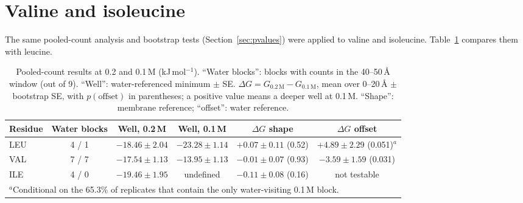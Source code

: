 \documentclass[11pt,a4paper]{article}
\begin{document}
\section{Valine and isoleucine}
\label{sec:val_ile}

The same pooled-count analysis and bootstrap tests (Section~\ref{sec:pvalues}) were applied to
valine and isoleucine.
Table~\ref{tab:val_ile} compares them with leucine.

\begin{table}[H]
\centering
\caption{Pooled-count results at 0.2 and 0.1\,M (kJ\,mol$^{-1}$). ``Water blocks'': blocks
with counts in the 40--50\,\AA{} window (out of 9). ``Well'': water-referenced minimum
$\pm$ SE. $\Delta G = G_{0.2\,\text{M}} - G_{0.1\,\text{M}}$, mean over 0--20\,\AA{} $\pm$
bootstrap SE, with $p(\text{offset})$ in parentheses; a positive value means a deeper well at
0.1\,M. ``Shape'': membrane reference; ``offset'': water reference.}
\label{tab:val_ile}
\small
\setlength{\tabcolsep}{4pt}
\begin{tabular}{lccccc}
\toprule
Residue & Water blocks & Well, 0.2\,M & Well, 0.1\,M & $\Delta G$ shape & $\Delta G$ offset \\
\midrule
LEU & 4 / 1 & $-18.46 \pm 2.04$ & $-23.28 \pm 1.14$ & $+0.07 \pm 0.11$ (0.52) & $+4.89 \pm 2.29$ (0.051)$^{a}$ \\
VAL & 7 / 7 & $-17.54 \pm 1.13$ & $-13.95 \pm 1.13$ & $-0.01 \pm 0.07$ (0.93) & $-3.59 \pm 1.59$ (0.031) \\
ILE & 4 / 0 & $-19.46 \pm 1.95$ & undefined & $-0.11 \pm 0.08$ (0.16) & not testable \\
\bottomrule
\multicolumn{6}{l}{\footnotesize $^{a}$Conditional on the 65.3\% of replicates that contain the only
water-visiting 0.1\,M block.}
\end{tabular}
\end{table}
\end{document}
